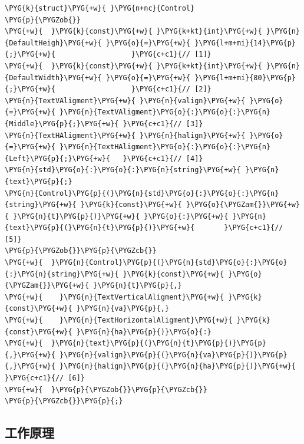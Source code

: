 \begin{codeblockbg}
\begin{Verbatim}[commandchars=\\\{\},breaklines=true,breakanywhere=true,fontsize=\codefont,xleftmargin=17bp]
\PYG{k}{struct}\PYG{+w}{ }\PYG{n+nc}{Control}
\PYG{p}{\PYGZob{}}
\PYG{+w}{  }\PYG{k}{const}\PYG{+w}{ }\PYG{k+kt}{int}\PYG{+w}{ }\PYG{n}{DefaultHeigh}\PYG{+w}{ }\PYG{o}{=}\PYG{+w}{ }\PYG{l+m+mi}{14}\PYG{p}{;}\PYG{+w}{                  }\PYG{c+c1}{// [1]}
\PYG{+w}{  }\PYG{k}{const}\PYG{+w}{ }\PYG{k+kt}{int}\PYG{+w}{ }\PYG{n}{DefaultWidth}\PYG{+w}{ }\PYG{o}{=}\PYG{+w}{ }\PYG{l+m+mi}{80}\PYG{p}{;}\PYG{+w}{                  }\PYG{c+c1}{// [2]}
\PYG{n}{TextVAligment}\PYG{+w}{ }\PYG{n}{valign}\PYG{+w}{ }\PYG{o}{=}\PYG{+w}{ }\PYG{n}{TextVAligment}\PYG{o}{:}\PYG{o}{:}\PYG{n}{Middle}\PYG{p}{;}\PYG{+w}{ }\PYG{c+c1}{// [3]}
\PYG{n}{TextHAligment}\PYG{+w}{ }\PYG{n}{halign}\PYG{+w}{ }\PYG{o}{=}\PYG{+w}{ }\PYG{n}{TextHAligment}\PYG{o}{:}\PYG{o}{:}\PYG{n}{Left}\PYG{p}{;}\PYG{+w}{   }\PYG{c+c1}{// [4]}
\PYG{n}{std}\PYG{o}{:}\PYG{o}{:}\PYG{n}{string}\PYG{+w}{ }\PYG{n}{text}\PYG{p}{;}
\PYG{n}{Control}\PYG{p}{(}\PYG{n}{std}\PYG{o}{:}\PYG{o}{:}\PYG{n}{string}\PYG{+w}{ }\PYG{k}{const}\PYG{+w}{ }\PYG{o}{\PYGZam{}}\PYG{+w}{ }\PYG{n}{t}\PYG{p}{)}\PYG{+w}{ }\PYG{o}{:}\PYG{+w}{ }\PYG{n}{text}\PYG{p}{(}\PYG{n}{t}\PYG{p}{)}\PYG{+w}{       }\PYG{c+c1}{// [5]}
\PYG{p}{\PYGZob{}}\PYG{p}{\PYGZcb{}}
\PYG{+w}{  }\PYG{n}{Control}\PYG{p}{(}\PYG{n}{std}\PYG{o}{:}\PYG{o}{:}\PYG{n}{string}\PYG{+w}{ }\PYG{k}{const}\PYG{+w}{ }\PYG{o}{\PYGZam{}}\PYG{+w}{ }\PYG{n}{t}\PYG{p}{,}
\PYG{+w}{    }\PYG{n}{TextVerticalAligment}\PYG{+w}{ }\PYG{k}{const}\PYG{+w}{ }\PYG{n}{va}\PYG{p}{,}
\PYG{+w}{    }\PYG{n}{TextHorizontalAligment}\PYG{+w}{ }\PYG{k}{const}\PYG{+w}{ }\PYG{n}{ha}\PYG{p}{)}\PYG{o}{:}
\PYG{+w}{  }\PYG{n}{text}\PYG{p}{(}\PYG{n}{t}\PYG{p}{)}\PYG{p}{,}\PYG{+w}{ }\PYG{n}{valign}\PYG{p}{(}\PYG{n}{va}\PYG{p}{)}\PYG{p}{,}\PYG{+w}{ }\PYG{n}{halign}\PYG{p}{(}\PYG{n}{ha}\PYG{p}{)}\PYG{+w}{                 }\PYG{c+c1}{// [6]}
\PYG{+w}{  }\PYG{p}{\PYGZob{}}\PYG{p}{\PYGZcb{}}
\PYG{p}{\PYGZcb{}}\PYG{p}{;}
\end{Verbatim}
\end{codeblockbg}



\subsection{工作原理}



